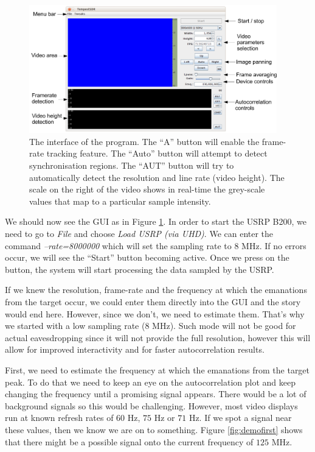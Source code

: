 \documentclass[a4paper,12pt,twoside,openright]{report}
\begin{document}
\begin{figure}[h]
\centering
  \includegraphics[width=0.96\textwidth]{demo_interface}
  \caption{The interface of the program. The ``A'' button will enable the frame-rate tracking feature. The ``Auto'' button will attempt to detect synchronisation regions. The ``AUT'' button will try to automatically detect the resolution and line rate (video height). The scale on the right of the video shows in real-time the grey-scale values that map to a particular sample intensity.}
  \label{fig:demoiface}
\end{figure}

We should now see the GUI as in Figure \ref{fig:demoiface}. In order to start the USRP B200, we need to go to \textit{File} and choose \textit{Load USRP (via UHD)}. We can enter the command \textit{--rate=8000000 } which will set the sampling rate to $8$ MHz. If no errors occur, we will see the ``Start'' button becoming active. Once we press on the button, the system will start processing the data sampled by the USRP.

If we knew the resolution, frame-rate and the frequency at which the emanations from the target occur, we could enter them directly into the GUI and the story would end here. However, since we don't, we need to estimate them. That's why we started with a low sampling rate ($8$ MHz). Such mode will not be good for actual eavesdropping since it will not provide the full resolution, however this will allow for improved interactivity and for faster autocorrelation results.

First, we need to estimate the frequency at which the emanations from the target peak. To do that we need to keep an eye on the autocorrelation plot and keep changing the frequency until a promising signal appears. There would be a lot of background signals so this would be challenging. However, most video displays run at known refresh rates of $60$ Hz, $75$ Hz or $71$ Hz. If we spot a signal near these values, then we know we are on to something. Figure \ref{fig:demofirst} shows that there might be a possible signal onto the current frequency of $125$ MHz.
\end{document}
